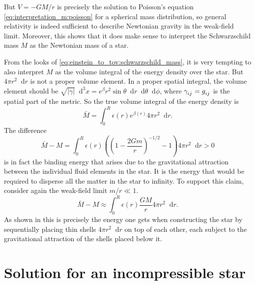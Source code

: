 \documentclass[a4paper,11pt,twoside]{report}
\newcommand\dif{\mathop{}\!\mathrm{d}}
\newcommand{\abs}[1]{\lvert #1 \rvert}
\newcommand{\integral}[4]{\int_{#3}^{#4} #1 \dif #2}
\begin{document}
But $V = - G M / r$ is precisely the solution to Poisson's equation \eqref{eq:interpretation_m:poisson} for a spherical mass distribution, so general relativity is indeed sufficient to describe Newtonian gravity in the weak-field limit.
Moreover, this shows that it does make sense to interpret the Schwarzschild mass $M$ as the Newtonian mass of a star.

From the looks of \cref{eq:einstein_to_tov:schwarzschild_mass}, it is very tempting to also interpret $M$ as the volume integral of the energy density over the star.
But $4 \pi r^2 \dif r$ is not a proper volume element.
In a proper spatial integral, the volume element should be $\sqrt{\abs{\gamma}} \dif^3 x = e^\beta r^2 \sin \theta \dif r \dif \theta \dif \phi$, where $\gamma\indices{_i_j} = g\indices{_i_j}$ is the spatial part of the metric.
So the true volume integral of the energy density is
\begin{equation*}
	\bar{M} = \integral{\epsilon(r) e^{\beta(r)} 4 \pi r^2}{r}{0}{R}.
\end{equation*}
The difference
\begin{equation*}
	\bar{M} - M = \integral{\epsilon(r) \left( \left( 1-\frac{2Gm}{r} \right)^{-1/2} - 1 \right) 4 \pi r^2}{r}{0}{R} > 0
\end{equation*}
is in fact the binding energy that arises due to the gravitational attraction between the individual fluid elements in the star.
It is the energy that would be required to disperse all the matter in the star to infinity. \cite{ref:carroll}
To support this claim, consider again the weak-field limit $m/r \ll 1$.
\begin{equation}
	\bar{M} - M \approx \integral{\epsilon(r) \frac{GM}{r} 4 \pi r^2}{r}{0}{R} .
\end{equation}
As shown in \cite[exercise 23.7]{ref:mtw} this is precisely the energy one gets when constructing the star by sequentially placing thin shells $4 \pi r^2 \dif r$ on top of each other, each subject to the gravitational attraction of the shells placed below it.

\section{Solution for an incompressible star}

\end{document}
